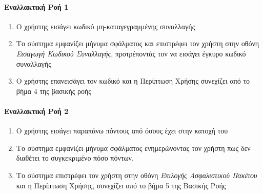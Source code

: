 \documentclass{../ol-softwaremanual}
\begin{document}
	\paragraph{Εναλλακτική Ροή 1 }
	
	\begin{enumerate}
		\item Ο χρήστης εισάγει κωδικό μη-καταγεγραμμένης συναλλαγής
		\item Το σύστημα εμφανίζει μήνυμα σφάλματος και επιστρέφει τον χρήστη στην  οθόνη \textit{Εισαγωγή Κωδικού Συναλλαγής}, προτρέποντάς τον να εισάγει έγκυρο κωδικό συναλλαγής
		\item Ο χρήστης επανεισάγει τον κωδικό και η Περίπτωση Χρήσης συνεχίζει από το βήμα 4 της βασικής ροής
	\end{enumerate}
	
	\paragraph{Εναλλακτική Ροή 2}
	\begin{enumerate}
		\item Ο χρήστης εισάγει παραπάνω πόντους από όσους έχει στην κατοχή του
		\item Το σύστημα εμφανίζει μήνυμα σφάλματος ενημερώνοντας τον χρήστη πως δεν διαθέτει το συγκεκριμένο πόσο πόντων.
		\item Το σύστημα επιστρέφει τον χρήστη στην οθόνη \textit{Επιλογής Ασφαλιστικού Πακέτου} και η Περίπτωση Χρήσης, συνεχίζει από το βήμα 5 της Βασικής Ροής
	\end{enumerate}
	
\end{document}

